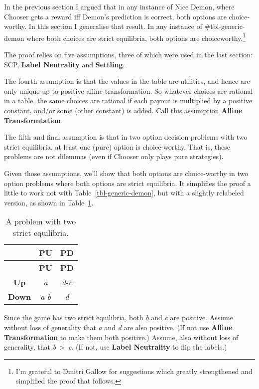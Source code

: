 \documentclass[
  10pt,
  letterpaper,
  DIV=11,
  numbers=noendperiod,
  twoside]{scrartcl}
\begin{document}
In the previous section I argued that in any instance of Nice Demon,
where Chooser gets a reward iff Demon's prediction is correct, both
options are choice-worthy. In this section I generalise that result. In
any instance of \#tbl-generic-demon where both choices are strict
equilibria, both options are choiceworthy.\footnote{I'm grateful to
  Dmitri Gallow for suggestions which greatly strengthened and
  simplified the proof that follows.}

The proof relies on five assumptions, three of which were used in the
last section: SCP, \textbf{Label Neutrality} and \textbf{Settling}.

The fourth assumption is that the values in the table are utilities, and
hence are only unique up to positive affine transformation. So whatever
choices are rational in a table, the same choices are rational if each
payout is multiplied by a positive constant, and/or some (other
constant) is added. Call this assumption \textbf{Affine
Transformtation}.

The fifth and final assumption is that in two option decision problems
with two strict equilibria, at least one (pure) option is choice-worthy.
That is, these problems are not dilemmas (even if Chooser only plays
pure strategies).

Given those assumptions, we'll show that both options are choice-worthy
in two option problems where both options are strict equilibria. It
simplifies the proof a little to work not with
Table~\ref{tbl-generic-demon}, but with a slightly relabeled version, as
shown in Table~\ref{tbl-two-good}.

\begin{longtable}[]{@{}ccc@{}}
\caption{A problem with two strict
equilibria.}\label{tbl-two-good}\tabularnewline
\toprule\noalign{}
& \textbf{PU} & \textbf{PD} \\
\midrule\noalign{}
\endfirsthead
\toprule\noalign{}
& \textbf{PU} & \textbf{PD} \\
\midrule\noalign{}
\endhead
\bottomrule\noalign{}
\endlastfoot
\textbf{Up} & \emph{a} & \emph{d}-\emph{c} \\
\textbf{Down} & \emph{a}-\emph{b} & \emph{d} \\
\end{longtable}

Since the game has two strict equilibria, both \emph{b} and \emph{c} are
positive. Assume without loss of generality that \emph{a} and \emph{d}
are also positive. (If not use \textbf{Affine Transformation} to make
them both positive.) Assume, also without loss of generality, that
\emph{b}~\textgreater~\emph{c}. (If not, use \textbf{Label Neutrality}
to flip the labels.)
\end{document}
